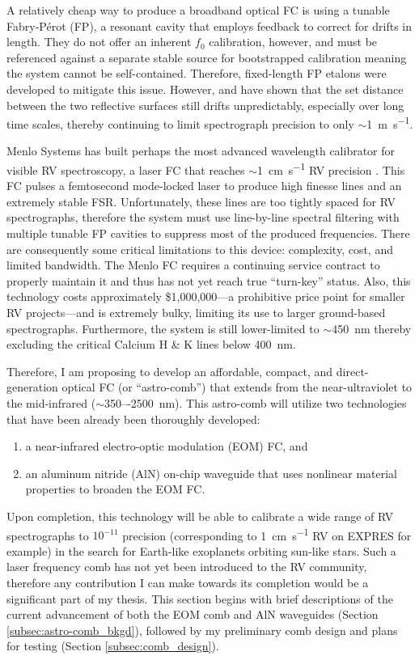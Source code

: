 \documentclass[11pt]{article}
\begin{document}
A relatively cheap way to produce a broadband optical FC is using a tunable Fabry-P\'erot (FP), a resonant cavity that employs feedback to correct for drifts in length. They do not offer an inherent $f_0$ calibration, however, and must be referenced against a separate stable source for bootstrapped calibration \citep{McCracken2014, Sturmer2017} meaning the system cannot be self-contained. Therefore, fixed-length FP etalons were developed to mitigate this issue. However, \citet{Reiners2014} and \citet{Wildi2012} have shown that the set distance between the two reflective surfaces still drifts unpredictably, especially over long time scales, thereby continuing to limit spectrograph precision to only $\sim$\SI{1}{\meter\per\second}.

Menlo Systems has built perhaps the most advanced wavelength calibrator for visible RV spectroscopy, a laser FC that reaches $\sim$\SI{1}{\centi\meter\per\second} RV precision \citep{Probst2014}. This FC pulses a femtosecond mode-locked laser to produce high finesse lines and an extremely stable FSR. Unfortunately, these lines are too tightly spaced for RV spectrographs, therefore the system must use line-by-line spectral filtering with multiple tunable FP cavities to suppress most of the produced frequencies. There are consequently some critical limitations to this device: complexity, cost, and limited bandwidth. The Menlo FC requires a continuing service contract to properly maintain it and thus has not yet reach true ``turn-key'' status. Also, this technology costs approximately \$1,000,000---a prohibitive price point for smaller RV projects---and is extremely bulky, limiting its use to larger ground-based spectrographs. Furthermore, the system is still lower-limited to $\sim$\SI{450}{\nano\meter} thereby excluding the critical Calcium H \& K lines below \SI{400}{\nano\meter}.

Therefore, I am proposing to develop an affordable, compact, and direct-generation optical FC (or ``astro-comb'') that extends from the near-ultraviolet to the mid-infrared ($\sim$350–-\SI{2500}{\nano\meter}). This astro-comb will utilize two technologies that have been already been thoroughly developed:
\begin{enumerate}
    \item a near-infrared electro-optic modulation (EOM) FC, and
    \item an aluminum nitride (AlN) on-chip waveguide that uses nonlinear material properties to broaden the EOM FC.
\end{enumerate}
Upon completion, this technology will be able to calibrate a wide range of RV spectrographs to $10^{-11}$ precision (corresponding to \SI{1}{\centi\meter\per\second} RV on EXPRES for example) in the search for Earth-like exoplanets orbiting sun-like stars. Such a laser frequency comb has not yet been introduced to the RV community, therefore any contribution I can make towards its completion would be a significant part of my thesis. This section begins with brief descriptions of the current advancement of both the EOM comb and AlN waveguides (Section \ref{subsec:astro-comb_bkgd}), followed by my preliminary comb design and plans for testing (Section \ref{subsec:comb_design}).
\end{document}

